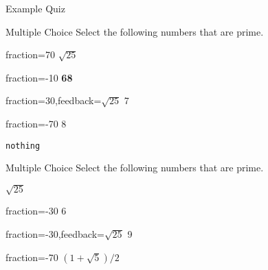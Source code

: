 \documentclass{article}
\def\myequation{$(1+\sqrt{5})/2$}
\begin{document}
\begin{quiz}{Example Quiz}
\begin{multi}[multiple,feedback={abc\\def $\sqrt{2}$}]{Multiple Choice}
Select the following numbers that are prime.
\item[fraction=70] $\sqrt{25}$
\item[fraction=-10] \textbf{68}
\item[fraction=30,feedback={$\sqrt{25}$}] 7
\item[fraction=-70] 8
\item \texttt{nothing}
\end{multi}

\begin{multi}[feedback={abc\\def $\sqrt{2}$}]{Multiple Choice}
Select the following numbers that are prime.
\item* $\sqrt{25}$
\item[fraction=-30] 6
\item[fraction=-30,feedback={$\sqrt{25}$}] 9
\item[fraction=-70] \myequation
\end{multi}

\end{quiz}
\end{document}
